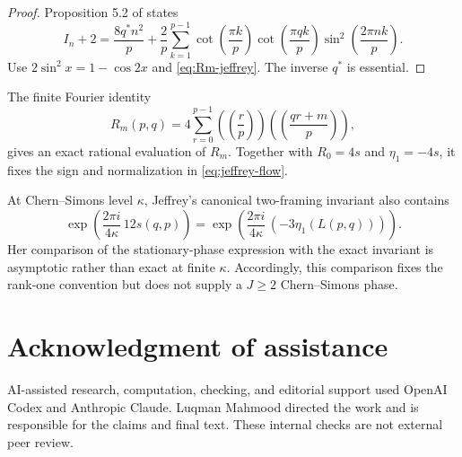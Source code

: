 \documentclass[11pt]{article}
\theoremstyle{definition}
\begin{document}
\begin{proof}
Proposition 5.2 of \cite{Jeffrey1992} states
\[
 I_n+2=\frac{8q^*n^2}{p}
 +\frac2p\sum_{k=1}^{p-1}
 \cot\left(\frac{\pi k}{p}\right)
 \cot\left(\frac{\pi qk}{p}\right)
 \sin^2\left(\frac{2\pi nk}{p}\right).
\]
Use $2\sin^2x=1-\cos2x$ and \eqref{eq:Rm-jeffrey}.  The inverse $q^*$ is
essential.
\end{proof}

The finite Fourier identity
\[
 R_m(p,q)=4\sum_{r=0}^{p-1}
 \left(\!\left(\frac rp\right)\!\right)
 \left(\!\left(\frac{qr+m}{p}\right)\!\right),
\]
gives an exact rational evaluation of $R_m$.  Together with
$R_0=4s$ and $\eta_1=-4s$, it fixes the sign and normalization in
\eqref{eq:jeffrey-flow}.

At Chern--Simons level $\kappa$, Jeffrey's canonical two-framing invariant
also contains
\[
 \exp\left(\frac{2\pi i}{4\kappa}\,12s(q,p)\right)
 =\exp\left(\frac{2\pi i}{4\kappa}\,(-3\eta_1(L(p,q)))\right).
\]
Her comparison of the stationary-phase expression with the exact invariant is
asymptotic rather than exact at finite $\kappa$.  Accordingly, this comparison
fixes the rank-one convention but does not supply a $J\geq2$
Chern--Simons phase.

\section*{Acknowledgment of assistance}
AI-assisted research, computation, checking, and editorial support used
OpenAI Codex and Anthropic Claude. Luqman Mahmood directed the work
and is responsible for the claims and final text. These internal
checks are not external peer review.



\end{document}
